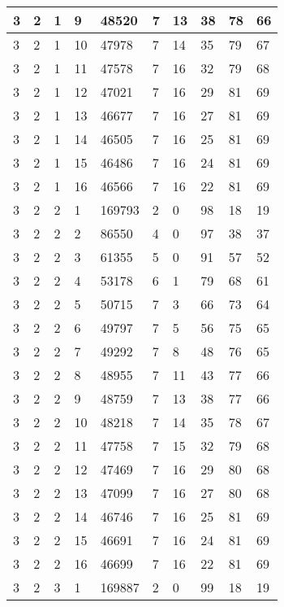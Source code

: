 \begin{table}[!ht]
\begin{tabular}{|l|l|l|l|l|l|l|l|l|l|}
        3 & 2 & 1 & 9 & 48520 & 7 & 13 & 38 & 78 & 66 \\ \hline
        3 & 2 & 1 & 10 & 47978 & 7 & 14 & 35 & 79 & 67 \\ \hline
        3 & 2 & 1 & 11 & 47578 & 7 & 16 & 32 & 79 & 68 \\ \hline
        3 & 2 & 1 & 12 & 47021 & 7 & 16 & 29 & 81 & 69 \\ \hline
        3 & 2 & 1 & 13 & 46677 & 7 & 16 & 27 & 81 & 69 \\ \hline
        3 & 2 & 1 & 14 & 46505 & 7 & 16 & 25 & 81 & 69 \\ \hline
        3 & 2 & 1 & 15 & 46486 & 7 & 16 & 24 & 81 & 69 \\ \hline
        3 & 2 & 1 & 16 & 46566 & 7 & 16 & 22 & 81 & 69 \\ \hline
        3 & 2 & 2 & 1 & 169793 & 2 & 0 & 98 & 18 & 19 \\ \hline
        3 & 2 & 2 & 2 & 86550 & 4 & 0 & 97 & 38 & 37 \\ \hline
        3 & 2 & 2 & 3 & 61355 & 5 & 0 & 91 & 57 & 52 \\ \hline
        3 & 2 & 2 & 4 & 53178 & 6 & 1 & 79 & 68 & 61 \\ \hline
        3 & 2 & 2 & 5 & 50715 & 7 & 3 & 66 & 73 & 64 \\ \hline
        3 & 2 & 2 & 6 & 49797 & 7 & 5 & 56 & 75 & 65 \\ \hline
        3 & 2 & 2 & 7 & 49292 & 7 & 8 & 48 & 76 & 65 \\ \hline
        3 & 2 & 2 & 8 & 48955 & 7 & 11 & 43 & 77 & 66 \\ \hline
        3 & 2 & 2 & 9 & 48759 & 7 & 13 & 38 & 77 & 66 \\ \hline
        3 & 2 & 2 & 10 & 48218 & 7 & 14 & 35 & 78 & 67 \\ \hline
        3 & 2 & 2 & 11 & 47758 & 7 & 15 & 32 & 79 & 68 \\ \hline
        3 & 2 & 2 & 12 & 47469 & 7 & 16 & 29 & 80 & 68 \\ \hline
        3 & 2 & 2 & 13 & 47099 & 7 & 16 & 27 & 80 & 68 \\ \hline
        3 & 2 & 2 & 14 & 46746 & 7 & 16 & 25 & 81 & 69 \\ \hline
        3 & 2 & 2 & 15 & 46691 & 7 & 16 & 24 & 81 & 69 \\ \hline
        3 & 2 & 2 & 16 & 46699 & 7 & 16 & 22 & 81 & 69 \\ \hline
        3 & 2 & 3 & 1 & 169887 & 2 & 0 & 99 & 18 & 19 \\ \hline

\end{tabular}
\end{table}
